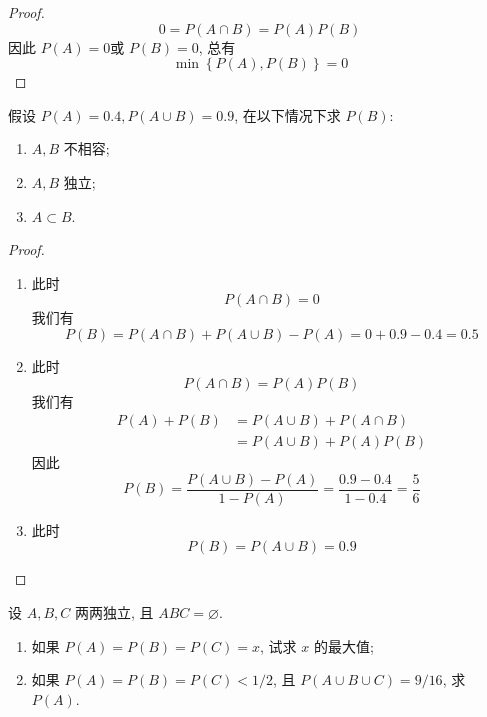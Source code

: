 \documentclass[../main.tex]{subfiles}
\begin{document}
\begin{proof}
    \[
 0=    P\left( A\cap B \right)= P\left( A \right)P\left( B \right)  
    \]因此 \(  P\left( A \right)= 0   \)或 \(  P\left( B \right)   = 0\), 总有 \[
    \min \left\{ P\left( A \right),P\left( B \right)   \right\}= 0
    \]   
\end{proof}
\begin{exercise}{}{}
假设 $P(A)=0.4, P(A \cup B)=0.9$, 在以下情况下求 $P(B)$:
\begin{enumerate}
    \item $A, B$ 不相容;
    \item $A, B$ 独立;
    \item $A \subset B$.
\end{enumerate}
\end{exercise}
\begin{proof}
    \begin{enumerate}
        \item 此时 \[
        P\left( A\cap B \right)= 0 
        \]我们有 \[
        P\left( B \right)= P\left( A\cap B \right)+ P\left( A\cup B \right)-P\left( A \right)= 0+ 0.9-0.4= 0.5    
        \]
        \item 此时 \[
        P\left( A\cap B \right)= P\left( A \right)P\left( B \right)   
        \]我们有 \[
        \begin{aligned}
        P\left( A \right)+ P\left( B \right)&= P\left( A\cup B \right)+ P\left( A\cap B \right)    \\ 
         &= P\left( A\cup B \right)+ P\left( A \right)P\left( B \right)    
        \end{aligned}
        \]因此 \[
        P\left( B \right)= \frac{P\left( A\cup B \right)-P\left( A \right)   }{1-P\left( A \right)  }  = \frac{0.9-0.4 }{1-0.4 }= \frac{5 }{6 }  
        \]
        \item 此时 \[
        P\left( B \right)= P\left( A\cup B \right)= 0.9  
        \]
    \end{enumerate}
    
\end{proof}
\begin{exercise}{}{}
设 $A, B, C$ 两两独立, 且 $ABC=\varnothing$.
\begin{enumerate}
    \item 如果 $P(A)=P(B)=P(C)=x$, 试求 $x$ 的最大值;
    \item 如果 $P(A)=P(B)=P(C)<1/2$, 且 $P(A \cup B \cup C)=9/16$, 求 $P(A)$.
\end{enumerate}
\end{exercise}
\end{document}
